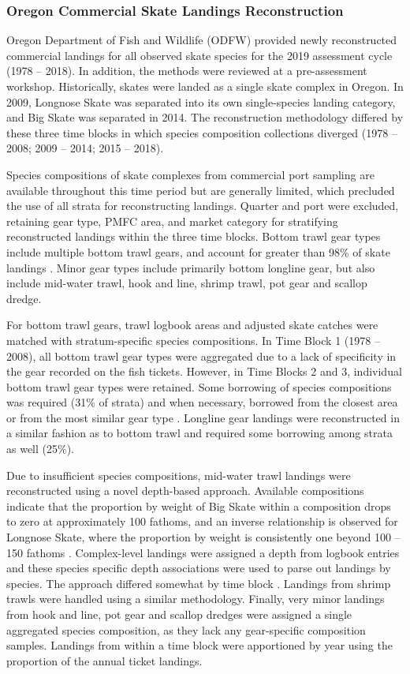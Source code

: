 \documentclass[12pt,]{article}
\begin{document}
\hypertarget{oregon-commercial-skate-landings-reconstruction}{%
\subsubsection{Oregon Commercial Skate Landings
Reconstruction}\label{oregon-commercial-skate-landings-reconstruction}}

Oregon Department of Fish and Wildlife (ODFW) provided newly
reconstructed commercial landings for all observed skate species for the
2019 assessment cycle (1978 -- 2018). In addition, the methods were
reviewed at a pre-assessment workshop. Historically, skates were landed
as a single skate complex in Oregon. In 2009, Longnose Skate was
separated into its own single-species landing category, and Big Skate
was separated in 2014. The reconstruction methodology differed by these
three time blocks in which species composition collections diverged
(1978 -- 2008; 2009 -- 2014; 2015 -- 2018).

Species compositions of skate complexes from commercial port sampling
are available throughout this time period but are generally limited,
which precluded the use of all strata for reconstructing landings.
Quarter and port were excluded, retaining gear type, PMFC area, and
market category for stratifying reconstructed landings within the three
time blocks. Bottom trawl gear types include multiple bottom trawl
gears, and account for greater than 98\% of skate landings . Minor gear
types include primarily bottom longline gear, but also include mid-water
trawl, hook and line, shrimp trawl, pot gear and scallop dredge.

For bottom trawl gears, trawl logbook areas and adjusted skate catches
were matched with stratum-specific species compositions. In Time Block 1
(1978 -- 2008), all bottom trawl gear types were aggregated due to a
lack of specificity in the gear recorded on the fish tickets. However,
in Time Blocks 2 and 3, individual bottom trawl gear types were
retained. Some borrowing of species compositions was required (31\% of
strata) and when necessary, borrowed from the closest area or from the
most similar gear type . Longline gear landings were reconstructed in a
similar fashion as to bottom trawl and required some borrowing among
strata as well (25\%).

Due to insufficient species compositions, mid-water trawl landings were
reconstructed using a novel depth-based approach. Available compositions
indicate that the proportion by weight of Big Skate within a composition
drops to zero at approximately 100 fathoms, and an inverse relationship
is observed for Longnose Skate, where the proportion by weight is
consistently one beyond 100 -- 150 fathoms . Complex-level landings were
assigned a depth from logbook entries and these species specific depth
associations were used to parse out landings by species. The approach
differed somewhat by time block . Landings from shrimp trawls were
handled using a similar methodology. Finally, very minor landings from
hook and line, pot gear and scallop dredges were assigned a single
aggregated species composition, as they lack any gear-specific
composition samples. Landings from within a time block were apportioned
by year using the proportion of the annual ticket landings.
\end{document}
